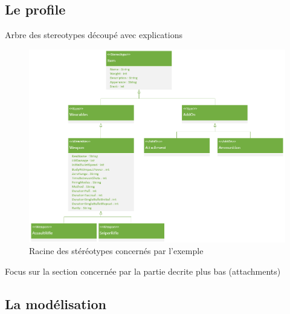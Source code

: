 \subsection{Le profile}
Arbre des stereotypes découpé avec explications
\begin{figure}[H]
    \centering
    \includegraphics[width=14cm]{10_img/chap6/root(stereotypes).PNG} 
    \caption{Racine des stéréotypes concernés par l'exemple}
\end{figure}
Focus sur la section concernée par la partie decrite plus bas (attachments)



\subsection{La modélisation}


